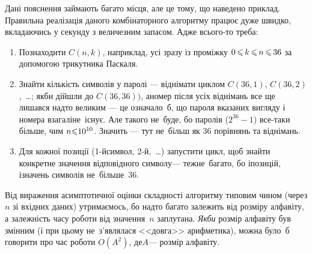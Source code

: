 Дані пояснення займають багато місця, але це тому, що наведено приклад. Правильна реалізація даного комбінаторного алгоритму працює дуже швидко, вкладаючись у секунду з величезним запасом. Адже всього-то треба:

\begin{enumerate}

\item
Познаходити $C(n,k)$, наприклад, усі зразу із проміжку $0\dib{{\<}}k\dib{{\<}}n\dib{{\<}}36$ за допомогою трикутника Паскаля.

\item
Знайти кількість символів у паролі --- віднімати циклом $C(36,1)$, $C(36,2)$,~\dots; якби дійшли до $C(36,36))$, а\nolinebreak[3] номер після усіх віднімань все ще лишався надто великим --- це означало~б, що пароля вказаних вигляду і номера взагалі\nolinebreak[2] не~існує. Але такого не~буде, бо паролів ($2^{36}-1$) все-таки більше, чим $n{\leqslant}10^{10}$. Значить --- тут %
не~більш як 36 порівнянь та віднімань.

\item
Для кожної позиції (1-й\nolinebreak[3] символ, 2-й,~\dots) запустити цикл, щоб знайти конкретне значення відповідного символу\nolinebreak[3] --- теж\nolinebreak[3] не~багато, бо і\nolinebreak[3] позицій, і\nolinebreak[3] значень символів не~більше~36.

\end{enumerate}

Від вираження асимптотичної оцінки складності алгоритму типовим чином (через $n$ зі вхідних даних) утримаємось, бо надто багато залежить від розміру алфавіту, а залежність часу роботи від значення~$n$ заплутана.
\emph{Якби} розмір алфавіту був змінним (і при цьому не~з'являлася <<довга>> арифметика), можна було~б говорити про час роботи $O(A^2)$, де\nolinebreak[3] $A$\nolinebreak[3] --- розмір алфавіту. 
